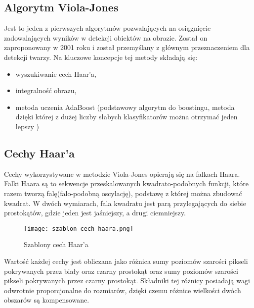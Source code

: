 \subsection{Algorytm Viola-Jones}
Jest to jeden z pierwszych algorytmów pozwalających na osiągnięcie zadowalających wyników w detekcji obiektów na obrazie. Został on zaproponowany w 2001 roku i został przemyślany z głównym przeznaczeniem dla detekcji twarzy. Na kluczowe koncepcje tej metody składają się:
\begin{itemize}
\item wyszukiwanie cech Haar'a,
\item integralność obrazu,
\item metoda uczenia AdaBoost (podstawowy algorytm do boostingu, metoda dzięki której z dużej liczby słabych klasyfikatorów można otrzymać jeden lepszy )
\end{itemize}

\subsection{Cechy Haar'a}
Cechy wykorzystywane w metodzie Viola-Jones opierają się na falkach Haara. Falki Haara są to sekwencje przeskalowanych kwadrato-podobnych funkcji, które razem tworzą falę(falo-podobną oscylację), podstawę z której można zbudować kwadrat. W dwóch wymiarach, fala kwadratu jest parą przylegających do siebie prostokątów, gdzie jeden jest jaśniejszy, a drugi ciemniejszy.
\begin{figure}[H]
	\centering
	\texttt{[image: szablon\_cech\_haara.png]}
	\caption{Szablony cech Haar'a}
	\label{fig:szablon_cech_haara}
\end{figure}
Wartość każdej cechy jest obliczana jako różnica sumy poziomów szarości pikseli pokrywanych przez biały oraz czarny prostokąt oraz sumy poziomów szarości pikseli pokrywanych przez czarny prostokąt. Składniki tej różnicy posiadają wagi odwrotnie proporcjonalne do rozmiarów, dzięki czemu różnice wielkości dwóch obszarów są kompensowane.

